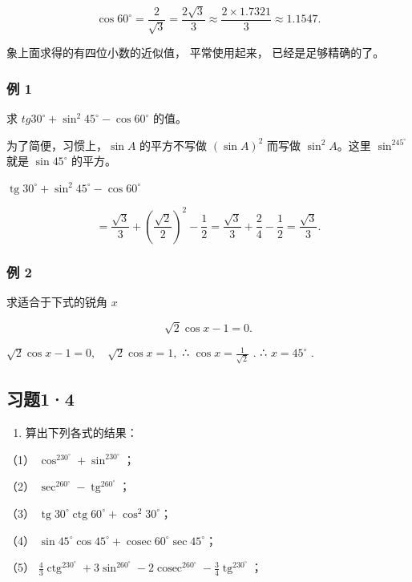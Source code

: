 \[
\cos 60 ^{\circ} = \frac {2}{\sqrt {3}} = \frac {2 \sqrt {3}}{3} \approx \frac {2 \times 1.7321}{3} \approx 1.1547.
\]

象上面求得的有四位小数的近似值， 平常使用起来， 已经是足够精确的了。

\subsubsection{例 1}

求 \(tg 30^{\circ} + \sin^{2}45^{\circ} - \cos 60^{\circ}\) 的值。

 为了简便，习惯上，\(\sin A\) 的平方不写做
\((\sin A)^2\) 而写做 \(\sin^2 A\)。这里 \(\sin^245^\circ\) 就是
\(\sin 45^\circ\) 的平方。

\(\operatorname{tg} 30^{\circ} + \sin^{2} 45^{\circ} - \cos 60^{\circ}\)

\[
= \frac {\sqrt {3}}{3} + \left(\frac {\sqrt {2}}{2}\right) ^ {2} - \frac {1}{2} = \frac {\sqrt {3}}{3} + \frac {2}{4} - \frac {1}{2} = \frac {\sqrt {3}}{3}.
\]

\subsubsection{例 2}

求适合于下式的锐角 \(x\)

\[
\sqrt {2} \cos x - 1 = 0.
\]

 \(\sqrt{2}\cos x - 1 = 0,\quad \sqrt{2}\cos x = 1,\) ∴
\(\cos x = \frac{1}{\sqrt{2}}\) . ∴ \(x = 45^{\circ}\) .

\subsection{习题1·4}

\begin{enumerate}
\item
  算出下列各式的结果：
\end{enumerate}

（1） \(\cos^230^\circ + \sin^230^\circ\)；

（2） \(\sec^260^\circ - \operatorname{tg}^260^\circ\)；

（3）
\(\operatorname{tg} 30^{\circ} \operatorname{ctg} 60^{\circ} + \cos^{2} 30^{\circ}\)；

（4）
\(\sin 45^{\circ} \cos 45^{\circ} + \operatorname{cosec} 60^{\circ} \sec 45^{\circ}\)；

（5）
\(\frac{4}{3} \operatorname{ctg}^230^\circ + 3 \sin^260^\circ - 2 \operatorname{cosec}^260^\circ - \frac{3}{4} \operatorname{tg}^230^\circ\)；

